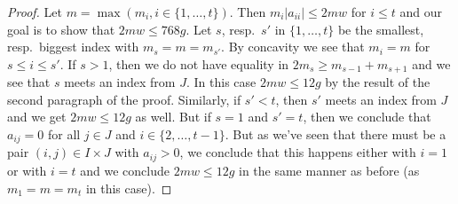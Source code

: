 \documentclass[10pt,a4paper]{amsart}
\theoremstyle{plain}
\theoremstyle{definition}
\theoremstyle{remark}
\numberwithin{equation}{subsection}
\begin{document}
\begin{proof}
\medskip\noindent
Let $m = \max(m_i, i \in \{1, \ldots, t\})$. Then
$m_i|a_{ii}| \leq 2mw$ for $i \leq t$ and
our goal is to show that $2mw \leq 768g$.
Let $s$, resp.\ $s'$ in $\{1, \ldots, t\}$ be the
smallest, resp.\ biggest index with $m_s = m = m_{s'}$.
By concavity we see that $m_i = m$ for $s \leq i \leq s'$.
If $s > 1$, then we do not have equality in
$2m_s \geq m_{s - 1} + m_{s + 1}$
and we see that $s$ meets an index from $J$.
In this case $2mw \leq 12g$ by the result of the second paragraph
of the proof.
Similarly, if $s' < t$, then $s'$ meets an index from $J$
and we get $2mw \leq 12g$ as well.
But if $s = 1$ and $s' = t$, then we conclude
that $a_{ij} = 0$ for all $j \in J$ and $i \in \{2, \ldots, t - 1\}$.
But as we've seen that there must be a pair $(i, j) \in I \times J$
with $a_{ij} > 0$, we conclude that this happens either with
$i = 1$ or with $i = t$ and we conclude $2mw \leq 12g$
in the same manner as before (as $m_1 = m = m_t$ in this case).
\end{proof}
\end{document}
